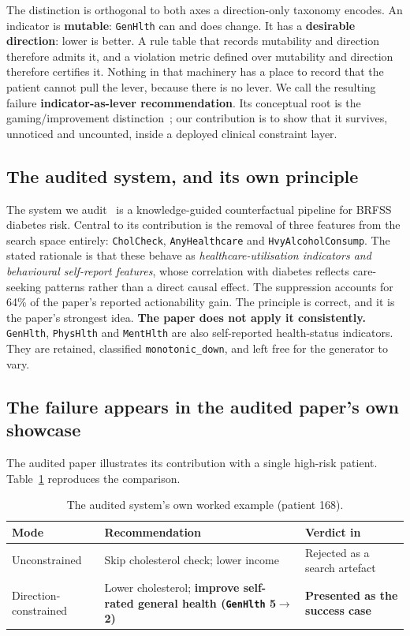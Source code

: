 \documentclass[conference]{IEEEtran}
\begin{document}
The distinction is orthogonal to both axes a direction-only taxonomy encodes. An indicator is \textbf{mutable}: \texttt{GenHlth} can and does change. It has a \textbf{desirable direction}: lower is better. A rule table that records mutability and direction therefore admits it, and a violation metric defined over mutability and direction therefore certifies it. Nothing in that machinery has a place to record that the patient cannot pull the lever, because there is no lever. We call the resulting failure \textbf{indicator-as-lever recommendation}. Its conceptual root is the gaming/improvement distinction~\cite{miller2020,konig2023}; our contribution is to show that it survives, unnoticed and uncounted, inside a deployed clinical constraint layer.

\subsection{The audited system, and its own principle}
The system we audit~\cite{thieu2026} is a knowledge-guided counterfactual pipeline for BRFSS diabetes risk. Central to its contribution is the removal of three features from the search space entirely: \texttt{CholCheck}, \texttt{AnyHealthcare} and \texttt{HvyAlcoholConsump}. The stated rationale is that these behave as \emph{healthcare-utilisation indicators and behavioural self-report features}, whose correlation with diabetes reflects care-seeking patterns rather than a direct causal effect. The suppression accounts for 64\% of the paper's reported actionability gain. The principle is correct, and it is the paper's strongest idea. \textbf{The paper does not apply it consistently.} \texttt{GenHlth}, \texttt{PhysHlth} and \texttt{MentHlth} are also self-reported health-status indicators. They are retained, classified \texttt{monotonic\_down}, and left free for the generator to vary.

\subsection{The failure appears in the audited paper's own showcase}
The audited paper illustrates its contribution with a single high-risk patient. Table~\ref{tab:patient168} reproduces the comparison.

\begin{table}[t]
\caption{The audited system's own worked example (patient 168).}
\label{tab:patient168}
\centering
\footnotesize
\begin{tabular}{@{}p{1.4cm}p{3.1cm}p{2.6cm}@{}}
\toprule
\textbf{Mode} & \textbf{Recommendation} & \textbf{Verdict in \cite{thieu2026}} \\
\midrule
Unconstrained & Skip cholesterol check; lower income & Rejected as a search artefact \\
Direction-constrained & Lower cholesterol; \textbf{improve self-rated general health (\texttt{GenHlth} 5$\rightarrow$2)} & \textbf{Presented as the success case} \\
\bottomrule
\end{tabular}
\end{table}
\end{document}
